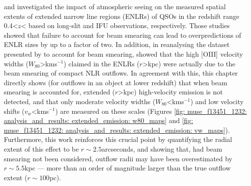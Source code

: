 \citet{Hainline2014} and \citet{Husemann2016} investigated the impact of atmospheric seeing on the measured spatial extents of extended narrow line regions (ENLRs) of QSOs in the redshift range 0.4\;\textless\;$z$\;\textless{} based on long-slit and IFU observations, respectively. Those studies showed that failure to account for beam smearing can lead to overpredictions of ENLR sizes by up to a factor of two. In addition, in reanalysing the dataset presented by \citet{Liu2014} to account for beam smearing, \citet{Husemann2016} showed that the high [OIII] velocity widths ($W_\mathrm{80}$\;\textgreater{}\;km\;s$^{-1}$) claimed in the ENLRs ($r$\;\textgreater{}\;kpc) were actually due to the beam smearing of compact NLR outflows. In agreement with this, this chapter directly shows (for outflows in an object at lower redshift) that when beam smearing is accounted for, extended ($r$\;\textgreater{}\;kpc) high-velocity emission is not detected, and that only moderate velocity widths ($W_\mathrm{80}$\;\textless{}\;km\;s$^{-1}$) and low velocity shifts ($v_w$\;\textless{}\;km\;s$^{-1}$) are measured on these scales (Figures \ref{fig: muse_f13451_1232: analysis_and_results: extended_emission: w80_maps} and \ref{fig: muse_f13451_1232: analysis_and_results: extended_emission: vw_maps}). Furthermore, this work reinforces this crucial point by quantifying the radial extent of this effect to be $r\sim2.5$\;arcseconds, and showing that, had beam smearing not been considered, outflow radii may have been overestimated by $r\sim5.5$\;kpc --- more than an order of magnitude larger than the true outflow extent ($r\sim100$\;pc).

